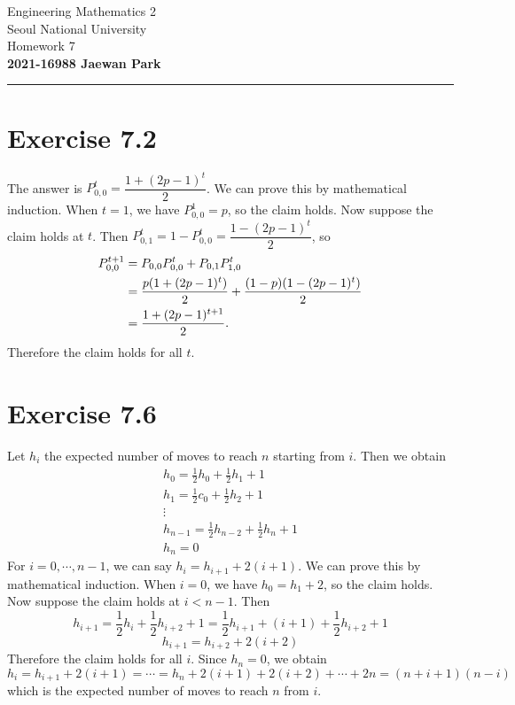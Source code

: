 \documentclass{article}
\begin{document}
\vspace*{-1.5cm}
{\centering \vbox{%
\vspace{2mm}
\large
Engineering Mathematics 2 \hfill
\\
Seoul National University
\\[4mm]
Homework 7 \\
\textbf{2021-16988 Jaewan Park} \\[0.8mm]
}}
\par\noindent\rule{\textwidth}{0.5pt}

\section*{Exercise 7.2}
The answer is $P_{0, 0}^{t} = \dfrac{1 + (2p-1)^t}{2}$. 
We can prove this by mathematical induction. 
When $t = 1$, we have $P_{0, 0}^{1} = p$, so the claim holds.
Now suppose the claim holds at $t$. 
Then $P_{0, 1}^{t} = 1 - P_{0, 0}^{t} = \dfrac{1 - (2p-1)^t}{2}$, so
\begin{align*}
    P_{0, 0}^{t+1} &= P_{0, 0}P_{0, 0}^{t} + P_{0, 1}P_{1, 0}^{t} \\
    &= \frac{p\qty(1 + (2p-1)^t)}{2} + \frac{(1-p)\qty(1 - (2p-1)^t)}{2} \\
    &= \frac{1 + (2p-1)^{t+1}}{2}.
\end{align*}
Therefore the claim holds for all $t$.

\section*{Exercise 7.6}
Let $h_i$ the expected number of moves to reach $n$ starting from $i$.
Then we obtain
\begin{gather*}
    h_0 = \frac{1}{2}h_0 + \frac{1}{2}h_1 + 1 \\
    h_1 = \frac{1}{2}c_0 + \frac{1}{2}h_2 + 1 \\
    \vdots \\
    h_{n-1} = \frac{1}{2}h_{n-2} + \frac{1}{2}h_n + 1 \\
    h_n = 0
\end{gather*}
For $i = 0, \cdots, n-1$, we can say $h_i = h_{i+1} + 2(i+1)$. 
We can prove this by mathematical induction.
When $i=0$, we have $h_0 = h_1 + 2$, so the claim holds.
Now suppose the claim holds at $i < n-1$. Then
$$h_{i+1} = \frac{1}{2}h_{i} + \frac{1}{2}h_{i+2} + 1 = \frac{1}{2}h_{i+1} + (i+1) + \frac{1}{2}h_{i+2} + 1$$
$$h_{i+1} = h_{i+2} + 2(i+2)$$
Therefore the claim holds for all $i$. 
Since $h_n = 0$, we obtain
$$h_{i} = h_{i+1} + 2(i+1) = \cdots = h_{n} + 2(i+1) + 2(i+2) + \cdots + 2n = (n+i+1)(n-i)$$
which is the expected number of moves to reach $n$ from $i$.
\end{document}
